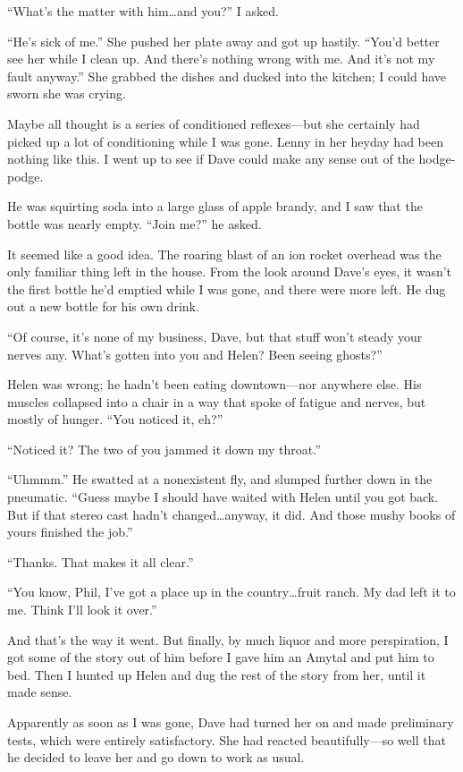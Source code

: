 \documentclass{article}
\begin{document}
“What’s the matter with him…and you?” I asked.

“He’s sick of me.” She pushed her plate away and got up hastily. “You’d better see her while I clean up. And there’s nothing wrong with me. And it’s not my fault anyway.” She grabbed the dishes and ducked into the kitchen; I could have sworn she was crying.

Maybe all thought is a series of conditioned reflexes—but she certainly had picked up a lot of conditioning while I was gone. Lenny in her heyday had been nothing like this. I went up to see if Dave could make any sense out of the hodge-podge.

He was squirting soda into a large glass of apple brandy, and I saw that the bottle was nearly empty. “Join me?” he asked.

It seemed like a good idea. The roaring blast of an ion rocket overhead was the only familiar thing left in the house. From the look around Dave’s eyes, it wasn’t the first bottle he’d emptied while I was gone, and there were more left. He dug out a new bottle for his own drink.

“Of course, it’s none of my business, Dave, but that stuff won’t steady your nerves any. What’s gotten into you and Helen? Been seeing ghosts?”

Helen was wrong; he hadn’t been eating downtown—nor anywhere else. His muscles collapsed into a chair in a way that spoke of fatigue and nerves, but mostly of hunger. “You noticed it, eh?”

“Noticed it? The two of you jammed it down my throat.”

“Uhmmm.” He swatted at a nonexistent fly, and slumped further down in the pneumatic. “Guess maybe I should have waited with Helen until you got back. But if that stereo cast hadn’t changed…anyway, it did. And those mushy books of yours finished the job.”

“Thanks. That makes it all clear.”

“You know, Phil, I’ve got a place up in the country…fruit ranch. My dad left it to me. Think I’ll look it over.”

And that’s the way it went. But finally, by much liquor and more perspiration, I got some of the story out of him before I gave him an Amytal and put him to bed. Then I hunted up Helen and dug the rest of the story from her, until it made sense.

Apparently as soon as I was gone, Dave had turned her on and made preliminary tests, which were entirely satisfactory. She had reacted beautifully—so well that he decided to leave her and go down to work as usual.
\end{document}
